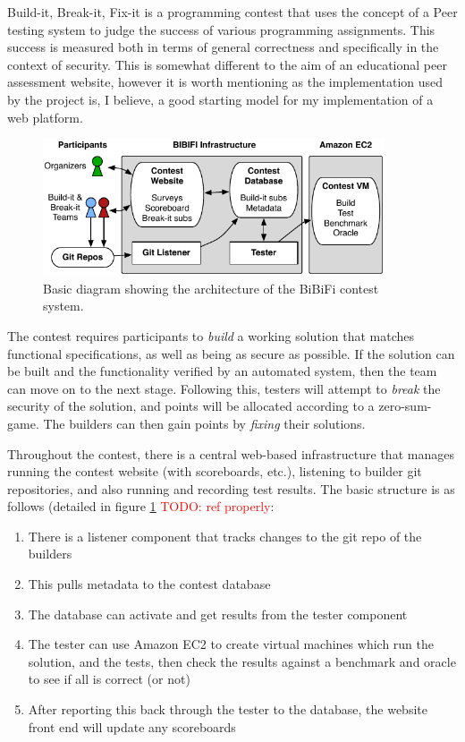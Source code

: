 \documentclass[a4paper,11pt]{report}
\newcommand{\todo}[1]{\textcolor{red}{TODO: #1}}
\begin{document}
Build-it, Break-it, Fix-it\cite{ruef_build_2016} is a programming contest that uses the concept of a Peer testing system to judge the success of various programming assignments. This success is measured both in terms of general correctness and specifically in the context of security. This is somewhat different to the aim of an educational peer assessment website, however it is worth mentioning as the implementation used by the project is, I believe, a good starting model for my implementation of a web platform.\par
\begin{figure}[ht]
\centering
\includegraphics[width=0.9\textwidth]{fig/bibifi.png}
\caption{\footnotesize Basic diagram showing the architecture of the BiBiFi contest system.}
\label{fig:bibifi}
\end{figure}
The contest requires participants to \textit{build} a working solution that matches functional specifications, as well as being as secure as possible. If the solution can be built and the functionality verified by an automated system, then the team can move on to the next stage. Following this, testers will attempt to \textit{break} the security of the solution, and points will be allocated according to a zero-sum-game. The builders can then gain points by \textit{fixing} their solutions.\par
Throughout the contest, there is a central web-based infrastructure that manages running the contest website (with scoreboards, etc.), listening to builder git repositories, and also running and recording test results. The basic structure is as follows (detailed in figure \ref{fig:bibifi} \todo{ref properly}:
\begin{enumerate}
 \item There is a listener component that tracks changes to the git repo of the builders
 \item This pulls metadata to the contest database
 \item The database can activate and get results from the tester component
 \item The tester can use Amazon EC2 to create virtual machines which run the solution, and the tests, then check the results against a benchmark and oracle to see if all is correct (or not)
 \item After reporting this back through the tester to the database, the website front end will update any scoreboards
\end{enumerate}
\end{document}
